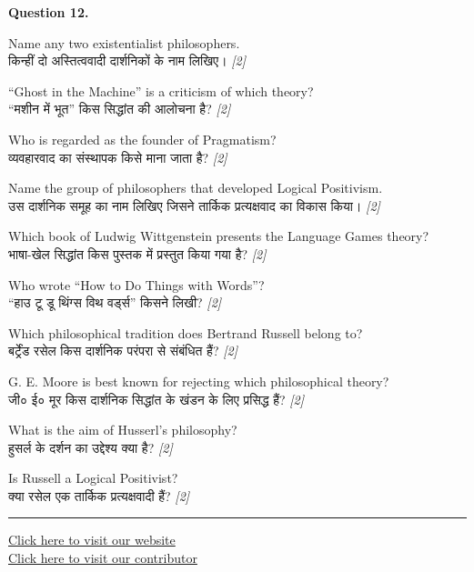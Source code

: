 \documentclass[11pt,a4paper]{article}
\newcommand{\pts}[1]{\hfill \textit{[#1]}}
\begin{document}
\noindent \textbf{Question 12.}
\begin{parts}
  \item Name any two existentialist philosophers.\\[1pt]
        किन्हीं दो अस्तित्ववादी दार्शनिकों के नाम लिखिए। \pts{2}

  \item ``Ghost in the Machine'' is a criticism of which theory?\\[1pt]
        ``मशीन में भूत'' किस सिद्धांत की आलोचना है? \pts{2}

  \item Who is regarded as the founder of Pragmatism?\\[1pt]
        व्यवहारवाद का संस्थापक किसे माना जाता है? \pts{2}

  \item Name the group of philosophers that developed Logical Positivism.\\[1pt]
        उस दार्शनिक समूह का नाम लिखिए जिसने तार्किक प्रत्यक्षवाद का विकास किया। \pts{2}

  \item Which book of Ludwig Wittgenstein presents the Language Games theory?\\[1pt]
        भाषा-खेल सिद्धांत किस पुस्तक में प्रस्तुत किया गया है? \pts{2}

  \item Who wrote ``How to Do Things with Words''?\\[1pt]
        ``हाउ टू डू थिंग्स विथ वर्ड्स'' किसने लिखी? \pts{2}

  \item Which philosophical tradition does Bertrand Russell belong to?\\[1pt]
        बर्ट्रेंड रसेल किस दार्शनिक परंपरा से संबंधित हैं? \pts{2}

  \item G. E. Moore is best known for rejecting which philosophical theory?\\[1pt]
        जी० ई० मूर किस दार्शनिक सिद्धांत के खंडन के लिए प्रसिद्ध हैं? \pts{2}

  \item What is the aim of Husserl's philosophy?\\[1pt]
        हुसर्ल के दर्शन का उद्देश्य क्या है? \pts{2}

  \item Is Russell a Logical Positivist?\\[1pt]
        क्या रसेल एक तार्किक प्रत्यक्षवादी हैं? \pts{2}
\end{parts}

\vfill
\rule{\linewidth}{0.4pt}

\begin{center}\small
\href{https://bhu-exam.vercel.app/}{Click here to visit our website}\\[4pt]
\href{https://me-aryan.vercel.app/}{Click here to visit our contributor}
\end{center}
\end{document}

